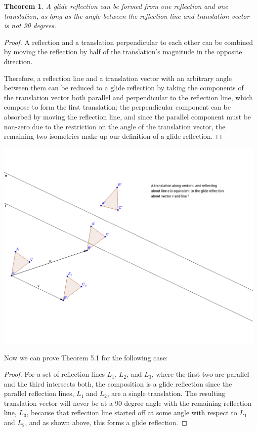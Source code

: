\documentclass[11pt]{article}
\newtheorem{theorem}{Theorem}[section]
\theoremstyle{definition}
\begin{document}
\begin{theorem}\label{glide reflection from a reflection and a translation}
  A glide reflection can be formed from one reflection and one translation,
  as long as the angle between the reflection line and translation vector is
  not 90 degrees.
\end{theorem}

\begin{proof}
  A reflection and a translation perpendicular to each other can be combined by
  moving the reflection by half of the translation's magnitude in the opposite
  direction.

  Therefore, a reflection line and a translation vector with an arbitrary angle
  between them can be reduced to a glide reflection by taking the components of
  the translation vector both parallel and perpendicular to the reflection
  line, which compose to form the first translation; the perpendicular
  component can be absorbed by moving the reflection line, and since the
  parallel component must be non-zero due to the restriction on the angle of
  the translation vector, the remaining two isometries make up our definition
  of a glide reflection.
\end{proof}

\includegraphics[scale=.4]{glide}

Now we can prove Theorem 5.1 for the following case:

\begin{proof}
  For a set of reflection lines $L_{1}$, $L_{2}$, and $L_{3}$, where the first
  two are parallel and the third intersects both, the composition is a glide
  reflection since the parallel reflection lines, $L_{1}$ and $L_{2}$, are a
  single translation. The resulting translation vector will never be at a 90
  degree angle with the remaining reflection line, $L_{3}$, because that
  reflection line started off at some angle with respect to $L_{1}$ and
  $L_{2}$, and as shown above, this forms a glide reflection.
\end{proof}
\end{document}
